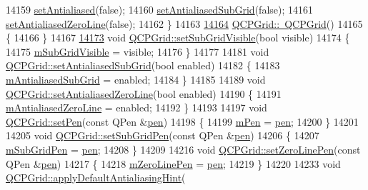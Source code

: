 \begin{DoxyCode}
14159   \hyperlink{a00044_a4fd43e89be4a553ead41652565ff0581}{setAntialiased}(\textcolor{keyword}{false});
14160   \hyperlink{a00116_ad8224d578ae67548d765a22b2bf95f6c}{setAntialiasedSubGrid}(\textcolor{keyword}{false});
14161   \hyperlink{a00116_abd1e85b9a9ee63be5e4113709326d061}{setAntialiasedZeroLine}(\textcolor{keyword}{false});
14162 \}
14163 
\hypertarget{a00115_source_l14164}{}\hyperlink{a00116_acf10d80f45e1be1fe8f7b84210228a4c}{14164} \hyperlink{a00116_acf10d80f45e1be1fe8f7b84210228a4c}{QCPGrid::~QCPGrid}()
14165 \{
14166 \}
14167 
\hypertarget{a00115_source_l14173}{}\hyperlink{a00116_ad4ad6bf714ec45e08845456355a1b700}{14173} \textcolor{keywordtype}{void} \hyperlink{a00116_ad4ad6bf714ec45e08845456355a1b700}{QCPGrid::setSubGridVisible}(\textcolor{keywordtype}{bool} visible)
14174 \{
14175   \hyperlink{a00116_a117dd29d26688e4651a5aae265e1f1b9}{mSubGridVisible} = visible;
14176 \}
14177 
14181 \textcolor{keywordtype}{void} \hyperlink{a00116_ad8224d578ae67548d765a22b2bf95f6c}{QCPGrid::setAntialiasedSubGrid}(\textcolor{keywordtype}{bool} enabled)
14182 \{
14183   \hyperlink{a00116_af55685e73eae391bbdfd4b2eec8484af}{mAntialiasedSubGrid} = enabled;
14184 \}
14185 
14189 \textcolor{keywordtype}{void} \hyperlink{a00116_abd1e85b9a9ee63be5e4113709326d061}{QCPGrid::setAntialiasedZeroLine}(\textcolor{keywordtype}{bool} enabled)
14190 \{
14191   \hyperlink{a00116_a52a4de0f44b2192ad7b97ce66e265649}{mAntialiasedZeroLine} = enabled;
14192 \}
14193 
14197 \textcolor{keywordtype}{void} \hyperlink{a00116_a499165f4744b6d22da7b24295910fb2c}{QCPGrid::setPen}(\textcolor{keyword}{const} QPen &\hyperlink{a00116_a1f13fffa0a0faac34ec342973e613a4a}{pen})
14198 \{
14199   \hyperlink{a00116_abcb7df1a54826856cb8f0e0ef696873b}{mPen} = \hyperlink{a00116_a1f13fffa0a0faac34ec342973e613a4a}{pen};
14200 \}
14201 
14205 \textcolor{keywordtype}{void} \hyperlink{a00116_a48c20da07dee569fc3acae82c9278fa7}{QCPGrid::setSubGridPen}(\textcolor{keyword}{const} QPen &\hyperlink{a00116_a1f13fffa0a0faac34ec342973e613a4a}{pen})
14206 \{
14207   \hyperlink{a00116_af21f3a7972c59242965129b985f53556}{mSubGridPen} = \hyperlink{a00116_a1f13fffa0a0faac34ec342973e613a4a}{pen};
14208 \}
14209 
14216 \textcolor{keywordtype}{void} \hyperlink{a00116_a03ce49d4768a12a2f05fa292880d10e4}{QCPGrid::setZeroLinePen}(\textcolor{keyword}{const} QPen &\hyperlink{a00116_a1f13fffa0a0faac34ec342973e613a4a}{pen})
14217 \{
14218   \hyperlink{a00116_ad8f3f742873da937274c85359dc03f7e}{mZeroLinePen} = \hyperlink{a00116_a1f13fffa0a0faac34ec342973e613a4a}{pen};
14219 \}
14220 
14233 \textcolor{keywordtype}{void} \hyperlink{a00116_a04062908d31c258aea6a7f9760c8431b}{QCPGrid::applyDefaultAntialiasingHint}(

\end{DoxyCode}
